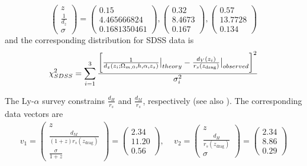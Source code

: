 \documentclass[universe,article,accept,moreauthors,pdftex]{Definitions/mdpi}
\begin{document}
\begin{equation*}
\begin{pmatrix}
z \\
\frac{1}{d_{z}} \\
\sigma
\end{pmatrix}=\begin{pmatrix}
0.15 \\
4.465666824 \\
0.1681350461
\end{pmatrix},\begin{pmatrix}
0.32\\
8.4673\\
0.167
\end{pmatrix},\begin{pmatrix}
0.57\\
13.7728\\
0.134
\end{pmatrix}
\end{equation*}
and the corresponding distribution for SDSS data is \cite{Theodoropoulos:2021hkk}\begin{equation}\chi^{2}_{SDSS}=\sum^{3}_{i=1}\frac{\bigg{[}\frac{1}{d_{z}(z_{i};\Omega_{m,0},h,\alpha,z_{s})}\big{|}_{theory}-\frac{d_{V}(z_{i})}{r_{s}(z_{\text{drag}})}\big{|}_{observed}\bigg{]}^2}{\sigma_{i}^{2}}\end{equation}

 
 The Ly-$\alpha$ survey constrains $  \frac{d_{H}}{r_{s}}$ and $  \frac{d_{M}}{r_{s}}$, respectively (see also \cite{Theodoropoulos:2021hkk}). The corresponding data vectors are \cite{Theodoropoulos:2021hkk} 
\begin{align}    
v_{1}=
\begin{pmatrix}
z\\
\frac{d_{M}}{(1+z) r_{s}(z_{\text{drag}})}\\
\frac{\sigma}{1+z}
\end{pmatrix}
=
\begin{pmatrix}
2.34\\
11.20\\
0.56
\end{pmatrix},\, \quad v_{2}
=
\begin{pmatrix}
z\\
\frac{d_{H}}{r_{s}(z_{\text{drag}})}\\
\sigma\end{pmatrix}=\begin{pmatrix}
2.34\\
8.86\\
0.29
\end{pmatrix}
\end{align}
\end{document}
